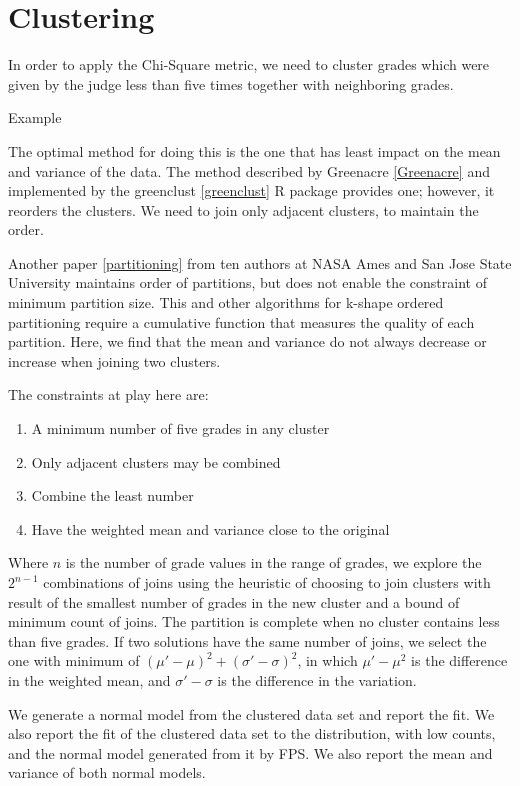 \section{Clustering}

In order to apply the Chi-Square metric, we need to cluster grades which
were given by the judge less than five times together with neighboring
grades.

Example

The optimal method for doing this is the one that has least impact on
the mean and variance of the data. The method described by
Greenacre \ref{Greenacre}
and implemented by the
greenclust \ref{greenclust}
R package provides one; however, it reorders the clusters.
We need to join only adjacent clusters, to maintain the order.

Another paper
\ref {partitioning}
from ten authors at NASA Ames and San Jose State University
maintains order of partitions, but does not enable the constraint of
minimum partition size. This and other algorithms for k-shape
ordered partitioning require a cumulative
function that measures the quality of each partition.
Here, we find that the mean and variance do not always decrease or
increase when joining two clusters.

The constraints at play here are:
\begin{enumerate}
\item{A minimum number of five grades in any cluster}
\item{Only adjacent clusters may be combined}
\item{Combine the least number}
\item{Have the weighted mean and variance close to the original}
\end{enumerate}

Where $n$ is the number of grade values in the range of grades,
we explore the $2^{n-1}$ combinations of joins using the heuristic
of choosing to join clusters with result of the smallest number of grades
in the new cluster and a bound of minimum count of joins. The partition
is complete when no cluster contains less than five grades. If two solutions
have the same number of joins, we select the one with minimum of
$(\mu' - \mu)^2 + (\sigma' - \sigma)^2$, in which
$\mu' - \mu^2$ is
the difference in the weighted mean, and
$\sigma' - \sigma$ is
the difference in the variation.

We generate a normal model from the clustered data set and report
the fit. We also report the fit of the clustered data set to
the distribution, with low counts, and the normal model generated
from it by FPS.
We also report the mean and variance of both normal models.
